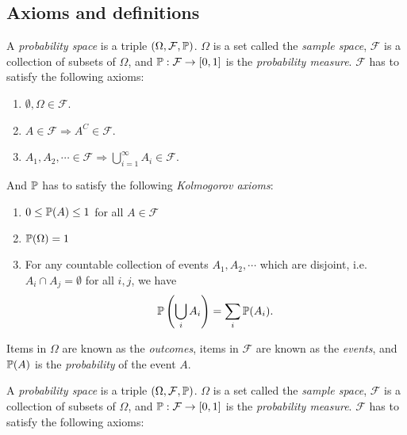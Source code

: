 \subsection{Axioms and definitions}

\begin{note}
  \begin{field}
    \begin{defi}
      A \emph{probability space} is a triple $(\Omega, \mathcal{F}, \P)$. $\Omega$ is a set called the \emph{sample space}, $\mathcal{F}$ is a collection of subsets of $\Omega$, and $\P: \mathcal{F}\to [0, 1]$ is the \emph{probability measure}.
      $\mathcal{F}$ has to satisfy the following axioms:
      \begin{enumerate}
        \item $\emptyset, \Omega\in \mathcal{F}$.
        \item $A\in \mathcal{F} \Rightarrow A^C\in \mathcal{F}$.
        \item $A_1, A_2, \cdots \in \mathcal{F} \Rightarrow \bigcup_{i = 1}^\infty A_i \in \mathcal{F}$.
      \end{enumerate}
      And $\P$ has to satisfy the following \emph{Kolmogorov axioms}:
      \begin{enumerate}
        \item $0 \leq \P(A) \leq 1 $ for all $A\in \mathcal{F}$
        \item $\P(\Omega) = 1$
        \item For any countable collection of events $A_1, A_2, \cdots$ which are disjoint, i.e.\ $A_i\cap A_j = \emptyset$ for all $i, j$, we have
          \[
            \P\left(\bigcup_i A_i\right) = \sum_i \P(A_i).
          \]
      \end{enumerate}
      Items in $\Omega$ are known as the \emph{outcomes}, items in $\mathcal{F}$ are known as the \emph{events}, and $\P(A)$ is the \emph{probability} of the event $A$.
    \end{defi}
  \end{field}
  \begin{field}
    \begin{defi}
      A \emph{probability space} is a triple $(\Omega, \mathcal{F}, \P)$. $\Omega$ is a set called the \emph{sample space}, $\mathcal{F}$ is a collection of subsets of $\Omega$, and $\P: \mathcal{F}\to [0, 1]$ is the \emph{probability measure}.
      $\mathcal{F}$ has to satisfy the following axioms:

\end{defi}
\end{field}
\end{note}
